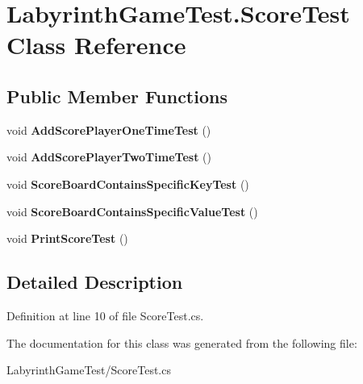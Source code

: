 \hypertarget{class_labyrinth_game_test_1_1_score_test}{\section{Labyrinth\+Game\+Test.\+Score\+Test Class Reference}
\label{class_labyrinth_game_test_1_1_score_test}
}
\subsection*{Public Member Functions}
\begin{DoxyCompactItemize}
\item 
\hypertarget{class_labyrinth_game_test_1_1_score_test_a14546ff4308c557d79f8d6689810d2c1}{void {\bfseries Add\+Score\+Player\+One\+Time\+Test} ()}\label{class_labyrinth_game_test_1_1_score_test_a14546ff4308c557d79f8d6689810d2c1}

\item 
\hypertarget{class_labyrinth_game_test_1_1_score_test_ac7559f550b3685409a7ba5450b27514f}{void {\bfseries Add\+Score\+Player\+Two\+Time\+Test} ()}\label{class_labyrinth_game_test_1_1_score_test_ac7559f550b3685409a7ba5450b27514f}

\item 
\hypertarget{class_labyrinth_game_test_1_1_score_test_aa0f72232a1fc868be36b9aba3f4ffdaa}{void {\bfseries Score\+Board\+Contains\+Specific\+Key\+Test} ()}\label{class_labyrinth_game_test_1_1_score_test_aa0f72232a1fc868be36b9aba3f4ffdaa}

\item 
\hypertarget{class_labyrinth_game_test_1_1_score_test_ac741fe17f5c45d462c23d435a0d1ff37}{void {\bfseries Score\+Board\+Contains\+Specific\+Value\+Test} ()}\label{class_labyrinth_game_test_1_1_score_test_ac741fe17f5c45d462c23d435a0d1ff37}

\item 
\hypertarget{class_labyrinth_game_test_1_1_score_test_ad5268a5e3f16d74fd40c764c1a81f74e}{void {\bfseries Print\+Score\+Test} ()}\label{class_labyrinth_game_test_1_1_score_test_ad5268a5e3f16d74fd40c764c1a81f74e}

\end{DoxyCompactItemize}


\subsection{Detailed Description}


Definition at line 10 of file Score\+Test.\+cs.



The documentation for this class was generated from the following file\+:\begin{DoxyCompactItemize}
\item 
Labyrinth\+Game\+Test/Score\+Test.\+cs\end{DoxyCompactItemize}
